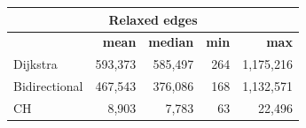 \begin{tabular}{@{}lrrrr@{}}
\toprule
\multicolumn{5}{c}{Relaxed edges} \\ \midrule
\textbf{} & \textbf{mean} & \textbf{median} & \textbf{min} & \textbf{max} \\ \midrule
Dijkstra & 593,373 & 585,497 & 264 & 1,175,216 \\
Bidirectional & 467,543 & 376,086 & 168 & 1,132,571 \\
CH & 8,903 & 7,783 & 63 & 22,496 \\ \bottomrule
\end{tabular}